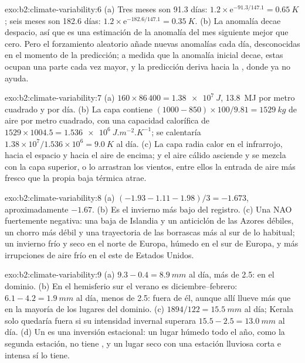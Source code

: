 \begin{solution}{exo:b2:climate-variability:6}
(a) Tres meses son 91.3 días: $1.2 \times \mathrm{e}^{-91.3/147.1} = \qty{0.65}{K}$; seis meses
son 182.6 días: $1.2 \times \mathrm{e}^{-182.6/147.1} = \qty{0.35}{K}$. (b) La anomalía decae
despacio, así que es una estimación de la anomalía del mes siguiente mejor que cero. Pero el forzamiento aleatorio añade
nuevas anomalías cada día, desconocidas en el momento de la predicción; a medida que la anomalía inicial decae,
estas ocupan una parte cada vez mayor, y la predicción deriva hacia la , donde ya no
ayuda.
\end{solution}

\begin{solution}{exo:b2:climate-variability:7}
(a) $160 \times 86\,400 = \qty{1.38e7}{J}$, \qty{13.8}{MJ} por metro cuadrado y por día. (b) La
capa contiene $(1000 - 850) \times 100/9.81 = \qty{1529}{kg}$ de aire por metro cuadrado, con una capacidad
calorífica de $1529 \times 1004.5 = \qty{1.536e6}{J.m^{-2}.K^{-1}}$; se calentaría $1.38 \times
10^7/1.536 \times 10^6 = \qty{9.0}{K}$ al día. (c) La capa radia calor en el infrarrojo, hacia el
espacio y hacia el aire de encima; y el aire cálido asciende y se mezcla con la capa superior, o
lo arrastran los vientos, entre ellos la entrada de aire más fresco que la propia baja térmica atrae.
\end{solution}

\begin{solution}{exo:b2:climate-variability:8}
(a) $(-1.93 - 1.11 - 1.98)/3 = -1.673$, aproximadamente $-1.67$. (b) Es el invierno más bajo del registro.
(c) Una NAO fuertemente negativa: una baja de Islandia y un anticiclón de las Azores débiles, un chorro más débil y una trayectoria de las borrascas
más al sur de lo habitual; un invierno frío y seco en el norte de Europa, húmedo en el sur de Europa,
y más irrupciones de aire frío en el este de Estados Unidos.
\end{solution}

\begin{solution}{exo:b2:climate-variability:9}
(a) $9.3 - 0.4 = \qty{8.9}{mm}$ al día, más de 2.5: en el dominio. (b) En el hemisferio sur
el verano es diciembre--febrero: $6.1 - 4.2 = \qty{1.9}{mm}$ al día, menos de 2.5: fuera de él,
aunque allí llueve más que en la mayoría de los lugares del dominio. (c) $1894/122 = \qty{15.5}{mm}$ al
día; Kerala solo quedaría fuera si su intensidad invernal superara $15.5 - 2.5 = \qty{13.0}{mm}$ al día.
(d) Un  es una inversión estacional: un lugar húmedo todo el año, como la segunda
estación, no tiene , y un lugar seco con una estación lluviosa corta e intensa sí lo tiene.
\end{solution}

